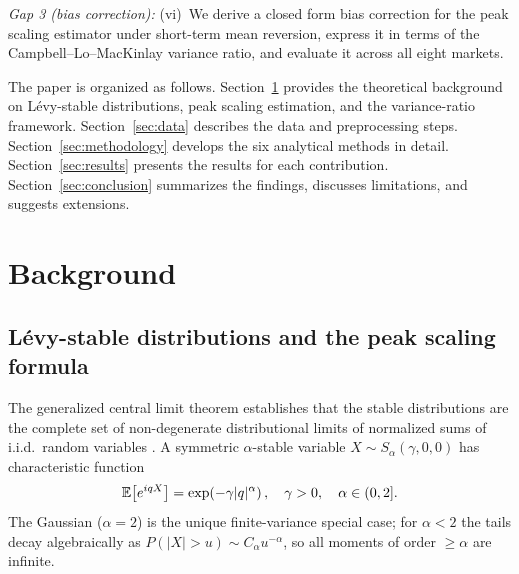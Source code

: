 \documentclass[conference]{IEEEtran}
\begin{document}
\textit{Gap 3 (bias correction):}
(vi)~We derive a closed form bias correction for the peak scaling estimator
under short-term mean reversion, express it in terms of the
Campbell--Lo--MacKinlay variance ratio, and evaluate it across all eight
markets.

The paper is organized as follows. Section~\ref{sec:background} provides
the theoretical background on Lévy-stable distributions, peak scaling
estimation, and the variance-ratio framework. Section~\ref{sec:data} describes
the data and preprocessing steps. Section~\ref{sec:methodology} develops the
six analytical methods in detail. Section~\ref{sec:results} presents the
results for each contribution. Section~\ref{sec:conclusion} summarizes the
findings, discusses limitations, and suggests extensions.


\section{Background}
\label{sec:background}

\subsection{Lévy-stable distributions and the peak scaling formula}
\label{sec:background:levy}

The generalized central limit theorem establishes that the stable
distributions are the complete set of non-degenerate distributional limits of
normalized sums of i.i.d.\ random variables \cite{SamorodTaqqu1994,GnedenkoKolmogorov1954,Nolan2020}.
A symmetric $\alpha$-stable variable $X \sim S_\alpha(\gamma,0,0)$ has
characteristic function
\begin{equation}
  \mathbb{E}\!\left[e^{iqX}\right] = \exp\!\left(-\gamma|q|^\alpha\right),
  \quad \gamma > 0,\quad \alpha \in (0,2].
  \label{eq:cf}
\end{equation}
The Gaussian ($\alpha = 2$) is the unique finite-variance special case; for
$\alpha < 2$ the tails decay algebraically as $P(|X|>u)\sim C_\alpha u^{-\alpha}$,
so all moments of order $\geq\alpha$ are infinite.
\end{document}
